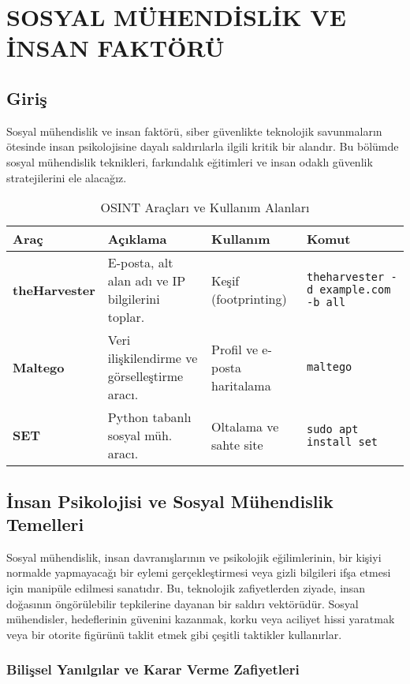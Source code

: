 \chapter{SOSYAL MÜHENDİSLİK VE İNSAN FAKTÖRÜ}

\section*{Giriş}
Sosyal mühendislik ve insan faktörü, siber güvenlikte teknolojik savunmaların ötesinde insan psikolojisine dayalı saldırılarla ilgili kritik bir alandır. Bu bölümde sosyal mühendislik teknikleri, farkındalık eğitimleri ve insan odaklı güvenlik stratejilerini ele alacağız.

\begin{longtable}{|>{\footnotesize}p{1.8cm}|>{\footnotesize}p{2.5cm}|>{\footnotesize}p{2cm}|>{\footnotesize}p{2.2cm}|}
    \caption{OSINT Araçları ve Kullanım Alanları} \\
    \hline
    \textbf{Araç} & \textbf{Açıklama} & \textbf{Kullanım} & \textbf{Komut} \\
    \hline
    \endhead
    \textbf{theHarvester} & E-posta, alt alan adı ve IP bilgilerini toplar. & Keşif (footprinting) & \texttt{theharvester -d example.com -b all} \\
    \hline
    \textbf{Maltego} & Veri ilişkilendirme ve görselleştirme aracı. & Profil ve e-posta haritalama & \texttt{maltego} \\
    \hline
    \textbf{SET} & Python tabanlı sosyal müh. aracı. & Oltalama ve sahte site & \texttt{sudo apt install set} \\
    \hline
\end{longtable}

\section{İnsan Psikolojisi ve Sosyal Mühendislik Temelleri}

Sosyal mühendislik, insan davranışlarının ve psikolojik eğilimlerinin, bir kişiyi normalde yapmayacağı bir eylemi gerçekleştirmesi veya gizli bilgileri ifşa etmesi için manipüle edilmesi sanatıdır. Bu, teknolojik zafiyetlerden ziyade, insan doğasının öngörülebilir tepkilerine dayanan bir saldırı vektörüdür. Sosyal mühendisler, hedeflerinin güvenini kazanmak, korku veya aciliyet hissi yaratmak veya bir otorite figürünü taklit etmek gibi çeşitli taktikler kullanırlar.

\subsection{Bilişsel Yanılgılar ve Karar Verme Zafiyetleri}

